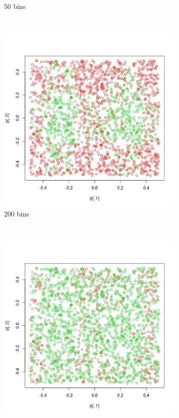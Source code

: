 \documentclass[12pt, a4paper]{article}
\begin{document}
\begin{figure}
\begin{subfigure}[b]{0.42\textwidth}
        \caption{50 bins}
    \end{subfigure}
      ~ %
    \begin{subfigure}[b]{0.42\textwidth}
        \includegraphics[width=\textwidth]{prediccion14}
        \caption{200 bins}
    \end{subfigure}
    ~ %
    \begin{subfigure}[b]{0.42\textwidth}
        \includegraphics[width=\textwidth]{prediccion16}

\end{subfigure}
\end{figure}
\end{document}
